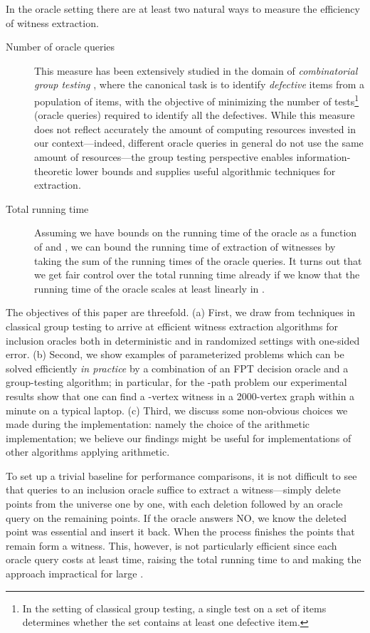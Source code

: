 \documentclass[11pt]{article}
\begin{document}
In the oracle setting there are at least two natural ways to measure
the efficiency of witness extraction. 
\begin{description}
\item[Number of oracle queries]
This measure has been extensively studied in the domain
of {\em combinatorial group testing} \cite{DuHwang2000}, 
where the canonical task is to identify  {\em defective} items 
from a population of  items, with the objective of minimizing
the number of tests\footnote{In the setting of classical group testing, a single test 
on a set of items determines whether the set contains at least 
one defective item.}
(oracle queries) required to identify all the
defectives. While this measure does not reflect accurately the amount 
of computing resources invested in our context---indeed, different 
oracle queries in general do not use the same amount of resources---the 
group testing perspective enables information-theoretic lower
bounds and supplies useful algorithmic techniques for extraction.
\item[Total running time]
Assuming we have bounds on the running time of the oracle
as a function of  and , we can bound the running time 
of extraction of witnesses by taking the sum of
the running times of the oracle queries. It turns
out that we get fair control over the total running
time already if we know that the running time of the oracle 
scales at least linearly in . 
\end{description}

The objectives of this paper are threefold. 
(a) First, we draw from techniques in classical group testing to arrive 
at efficient witness extraction algorithms for inclusion oracles both 
in deterministic and in randomized settings with one-sided error. 
(b) Second, we show examples of parameterized problems which can be solved efficiently {\em in practice} by 
a combination of an FPT decision oracle and a group-testing algorithm;
in particular, for the -path problem our experimental results show that one can find a -vertex witness in a 2000-vertex graph within a minute on a typical laptop. 
(c) Third, we discuss some non-obvious choices we made during the implementation: namely the choice of the  arithmetic implementation; we believe our findings might be useful for implementations of other algorithms applying  arithmetic.

To set up a trivial baseline for performance comparisons, it is not 
difficult to see that  queries to an inclusion oracle suffice 
to extract a witness---simply delete points from the universe one by one, 
with each deletion followed by an oracle query on the remaining points. 
If the oracle answers NO, we know the deleted point was essential and 
insert it back. When the process finishes the points that remain form 
a witness. This, however, is not particularly efficient since each oracle 
query costs at least  time, raising the total running time 
to  and making the approach impractical for 
large .
\end{document}
